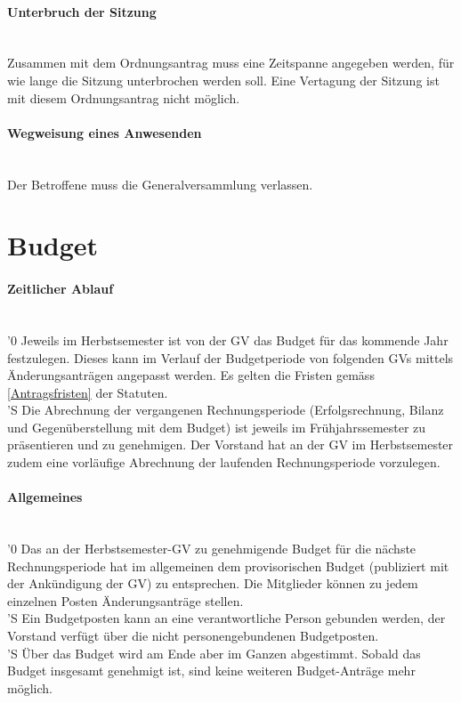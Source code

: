 \documentclass[a4paper,11pt]{article}
\newcommand{\nl}{\\[1.5ex]}
\begin{document}
\paragraph{Unterbruch der Sitzung} \ \\
Zusammen mit dem Ordnungsantrag muss eine Zeitspanne angegeben werden, für wie lange die Sitzung unterbrochen werden soll. Eine Vertagung der Sitzung ist mit diesem Ordnungsantrag nicht möglich.


\paragraph{Wegweisung eines Anwesenden} \ \\
Der Betroffene muss die Generalversammlung verlassen.


\section*{Budget}

\paragraph{Zeitlicher Ablauf} \ \\
'0 Jeweils im Herbstsemester ist von der GV das Budget für das kommende Jahr festzulegen. Dieses kann im Verlauf der Budgetperiode von folgenden GVs mittels Änderungsanträgen angepasst werden. Es gelten die Fristen gemäss \ref{Antragsfristen} der Statuten.\nl
'S Die Abrechnung der vergangenen Rechnungsperiode (Erfolgsrechnung, Bilanz und Gegenüberstellung mit dem Budget) ist jeweils im Frühjahrssemester zu präsentieren und zu genehmigen. Der Vorstand hat an der GV im Herbstsemester zudem eine vorläufige Abrechnung der laufenden Rechnungsperiode vorzulegen.

\paragraph{Allgemeines} \ \\
'0 Das an der Herbstsemester-GV zu genehmigende Budget für die nächste Rechnungsperiode hat im allgemeinen dem provisorischen Budget (publiziert mit der Ankündigung der GV) zu entsprechen. Die Mitglieder können zu jedem einzelnen Posten Änderungsanträge stellen. \nl
'S Ein Budgetposten kann an eine verantwortliche Person gebunden werden, der Vorstand verfügt über die nicht personengebundenen Budgetposten. \nl
'S Über das Budget wird am Ende aber im Ganzen abgestimmt. Sobald das Budget insgesamt genehmigt ist, sind keine weiteren Budget-Anträge mehr möglich.
\end{document}
